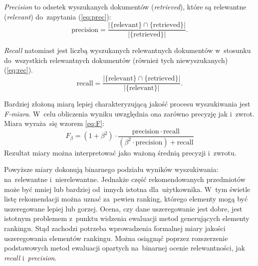 \documentclass[pl]{minipw} %
\begin{document}
\textit{Precision} to odsetek wyszukanych dokumentów (\textit{retrieved}), które są relewantne (\textit{relevant}) do~zapytania (\ref{eq:prec}): 
\begin{equation}
\label{eq:prec}
\mathrm{precision}=\frac{|\{\mathrm{relevant}\} \cap \{\mathrm{retrieved}\}|}{|\{\mathrm{retrieved}\}|}.
\end{equation}

\textit{Recall} natomiast jest liczbą wyszukanych relewantnych dokumentów w~stosunku do~wszystkich relewantnych dokumentów (również tych niewyszukanych) (\ref{eq:rec}).
\begin{equation}
\label{eq:rec}
\mathrm{recall}=\frac{|\{\mathrm{relevant}\} \cap \{\mathrm{retrieved}\}|}{|\{\mathrm{relevant}\}|}.
\end{equation}

Bardziej złożoną miarą lepiej charakteryzującą jakość procesu wyszukiwania jest \textit{F-miara}. W~celu obliczenia wyniku uwzględnia ona zarówno precyzję jak i~zwrot. Miara wyraża~się wzorem \ref{eq:F}:
\begin{equation}
\label{eq:F}
F_\beta = (1 + \beta^2) \cdot \frac{\mathrm{precision} \cdot \mathrm{recall}}{(\beta^2 \cdot \mathrm{precision}) + \mathrm{recall}}
\end{equation}
Rezultat miary można interpretować jako ważoną średnią precyzji i~zwrotu. 

Powyższe miary dokonują binarnego podziału wyników wyszukiwania: na~relewantne i~nierelewantne. Jednakże część rekomendowanych przedmiotów może być mniej lub bardziej od~innych istotna dla~użytkownika. W~tym świetle listę rekomendacji można uznać za~pewien ranking, którego elementy mogą być uszeregowane lepiej lub gorzej. Ocena, czy dane uszeregowanie jest dobre, jest istotnym problemem z~punktu widzenia ewaluacji metod generujących elementy rankingu. Stąd zachodzi potrzeba wprowadzenia formalnej miary jakości uszeregowania elementów rankingu. Można osiągnąć poprzez rozszerzenie podstawowych metod ewaluacji opartych na~binarnej ocenie relewantności, jak \textit{recall} i~\textit{precision}.
\end{document}
